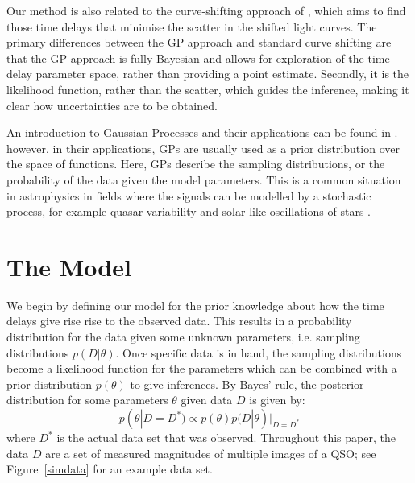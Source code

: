 \documentclass[useAMS,usenatbib, a4paper]{mn2e} \usepackage{natbib}
\begin{document}
Our method is also related to the curve-shifting approach of
\citet{1996A&A...305...97P}, which aims to find those time delays that
minimise the scatter in the shifted light curves. The primary differences
between the GP approach and standard curve shifting are that the GP approach
is fully Bayesian and allows for exploration of the time delay parameter
space, rather than providing a point estimate. Secondly, it is the likelihood
function, rather than the scatter, which guides the inference, making it clear
how uncertainties are to be obtained. 

An introduction to Gaussian Processes and their applications can be found in
\citet{rasmussen}. however, in their applications, GPs are usually used as a
prior distribution over the space of functions. Here, GPs describe the
sampling distributions, or the probability of the data given the model
parameters. This is a common situation in astrophysics in fields where the
signals can be modelled by a stochastic process, for example quasar
variability \citep{2009ApJ...698..895K, 2010ApJ...721.1014M, 2011ApJ...735...80Z} and solar-like
oscillations of stars \citep{2009MNRAS.395.2226B}.



\section{The Model}

We begin by defining our model for the prior knowledge about how the time
delays give rise rise to the observed data. This results in a probability
distribution for the data given some unknown parameters, i.e. sampling
distributions $p(D|\theta)$. Once specific data is in hand, the sampling
distributions become a likelihood function for the parameters which can be
combined with a prior distribution $p(\theta)$ to give inferences. By Bayes'
rule, the posterior distribution for some parameters $\theta$ given data $D$
is given by:
\begin{equation}
p(\theta|D = D^*) \propto p(\theta)p(D|\theta)|_{D = D^*}
\end{equation}
where $D^*$ is the actual data set that was observed. Throughout this paper,
the data $D$ are a set of measured magnitudes of multiple images of a QSO; see
Figure~\ref{simdata} for an example data set.
\end{document}
